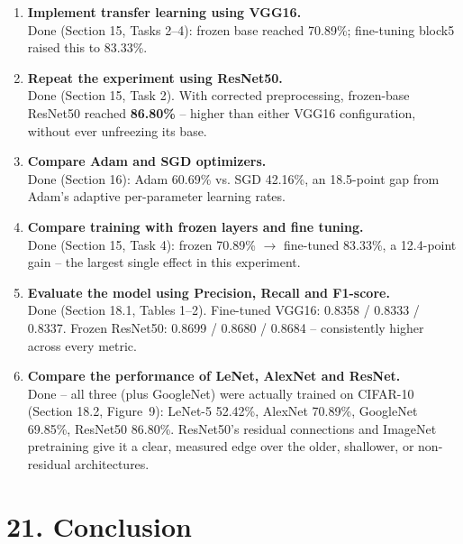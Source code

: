 \documentclass[11pt]{article}
\begin{document}
\begin{enumerate}

\item \textbf{Implement transfer learning using VGG16.}\\
Done (Section 15, Tasks 2--4): frozen base reached 70.89\%; fine-tuning
block5 raised this to 83.33\%.

\item \textbf{Repeat the experiment using ResNet50.}\\
Done (Section 15, Task 2). With corrected preprocessing, frozen-base
ResNet50 reached \textbf{86.80\%} -- higher than either VGG16
configuration, without ever unfreezing its base.

\item \textbf{Compare Adam and SGD optimizers.}\\
Done (Section 16): Adam 60.69\% vs. SGD 42.16\%, an 18.5-point gap
from Adam's adaptive per-parameter learning rates.

\item \textbf{Compare training with frozen layers and fine tuning.}\\
Done (Section 15, Task 4): frozen 70.89\% $\to$ fine-tuned 83.33\%,
a 12.4-point gain -- the largest single effect in this experiment.

\item \textbf{Evaluate the model using Precision, Recall and F1-score.}\\
Done (Section 18.1, Tables 1--2). Fine-tuned VGG16: 0.8358 / 0.8333 /
0.8337. Frozen ResNet50: 0.8699 / 0.8680 / 0.8684 -- consistently
higher across every metric.

\item \textbf{Compare the performance of LeNet, AlexNet and ResNet.}\\
Done -- all three (plus GoogleNet) were actually trained on CIFAR-10
(Section 18.2, Figure~9): LeNet-5 52.42\%, AlexNet 70.89\%, GoogleNet
69.85\%, ResNet50 86.80\%. ResNet50's residual connections and
ImageNet pretraining give it a clear, measured edge over the older,
shallower, or non-residual architectures.

\end{enumerate}

\section*{21. Conclusion}
\end{document}
